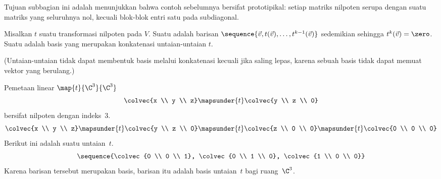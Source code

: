 Tujuan subbagian ini adalah menunjukkan bahwa contoh sebelumnya bersifat
prototipikal: setiap matriks nilpoten serupa dengan suatu matriks yang seluruhnya
nol, kecuali blok-blok entri satu pada subdiagonal.

\begin{definition}
Misalkan \( t \) suatu transformasi nilpoten pada \( V \).
Suatu 
adalah barisan
\( \sequence{\vec{v},t(\vec{v}),\ldots,t^{k-1}(\vec{v})} \)
sedemikian sehingga $t^k(\vec{v})=\zero$.
Suatu 
adalah basis yang merupakan konkatenasi untaian-untaian \( t \).
\end{definition}

\noindent (Untaian-untaian tidak dapat membentuk basis melalui konkatenasi
kecuali jika saling lepas, karena sebuah basis tidak dapat memuat vektor yang berulang.)

\begin{example}
Pemetaan linear \( \map{t}{\C^3}{\C^3} \)
\begin{equation*}
  \colvec{x \\ y \\ z}\mapsunder{t}\colvec{y \\ z \\ 0}
\end{equation*}
bersifat nilpoten dengan indeks~$3$.
\begin{equation*}
  \colvec{x \\ y \\ z}
  \mapsunder{t}\colvec{y \\ z \\ 0}
  \mapsunder{t}\colvec{z \\ 0 \\ 0}
  \mapsunder{t}\colvec{0 \\ 0 \\ 0}
\end{equation*}
Berikut ini adalah suatu untaian~$t$.
\begin{equation*}
  \sequence{\colvec{0 \\ 0 \\ 1},
            \colvec{0 \\ 1 \\ 0},
            \colvec{1 \\ 0 \\ 0}}
\end{equation*}
Karena barisan tersebut merupakan basis,
barisan itu adalah basis untaian~$t$ bagi ruang~$\C^3$.
\end{example}

